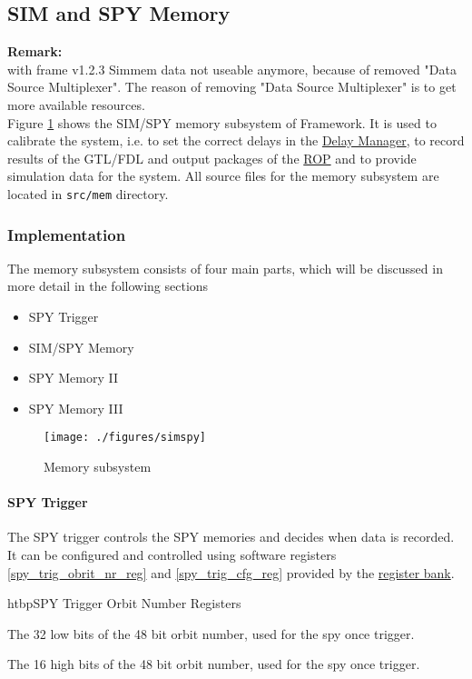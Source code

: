 \subsection{SIM and SPY Memory}\label{sec:framework:sim-spy}
\textbf{Remark:}\\
with frame v1.2.3 Simmem data not useable anymore, because of removed "Data Source Multiplexer".
The reason of removing "Data Source Multiplexer" is to get more available resources.\\

Figure \ref{fig_simspy} shows the SIM/SPY memory subsystem of Framework.
It is used to calibrate the system, i.e. to set the correct delays in the \hyperref[sec_dm]{Delay Manager}, to record results of the GTL/FDL and
output packages of the \hyperref[sec_rop]{ROP} and to provide simulation data for the system.
All source files for the memory subsystem are located in \texttt{src/mem} directory.

\subsubsection{Implementation}\label{sec:framework:sim_spy_impl}
The memory subsystem consists of four main parts, which will be discussed in more detail in the following sections

\begin{itemize}
\item SPY Trigger
\item SIM/SPY Memory
\item SPY Memory II
\item SPY Memory III
\end{itemize}

\begin{figure}[h]
\texttt{[image: ./figures/simspy]}
\caption{Memory subsystem}
\label{fig_simspy}
\end{figure}

\paragraph{SPY Trigger}\label{sec:framework:spy_trigger}
The SPY trigger controls the SPY memories and decides when data is recorded. It can be configured and controlled using
software registers \ref{spy_trig_obrit_nr_reg} and \ref{spy_trig_cfg_reg} provided by the \hyperref[sec_rb]{register bank}.

\begin{register}{htbp}{SPY Trigger Orbit Number Registers}{}%
	\label{spy_trig_obrit_nr_reg}
	\begin{regdesc}
	\begin{reglist}
		\item [orbit\_nr\_low] The 32 low bits of the 48 bit orbit number, used for the spy once trigger.
		\item [orbit\_nr\_high] The 16 high bits of the 48 bit orbit number, used for the spy once trigger.
	\end{reglist}
	\end{regdesc}
\end{register}

